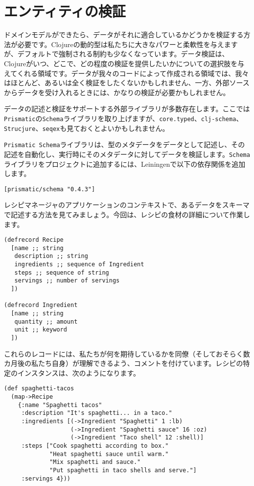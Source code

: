 \section{エンティティの検証}

ドメインモデルができたら、データがそれに適合しているかどうかを検証する方法が必要です。Clojureの動的型は私たちに大きなパワーと柔軟性を与えますが、デフォルトで強制される制約も少なくなっています。データ検証は、Clojureがいつ、どこで、どの程度の検証を提供したいかについての選択肢を与えてくれる領域です。データが我々のコードによって作成される領域では、我々はほとんど、あるいは全く検証をしたくないかもしれません、一方、外部ソースからデータを受け入れるときには、かなりの検証が必要かもしれません。

データの記述と検証をサポートする外部ライブラリが多数存在します。ここでは\texttt{Prismatic}の\texttt{Schema}ライブラリを取り上げますが、\texttt{core.typed}、\texttt{clj-schema}、\texttt{Strucjure}、\texttt{seqex}も見ておくとよいかもしれません。

\texttt{Prismatic Schema}ライブラリは、型のメタデータをデータとして記述し、その記述を自動化し、実行時にそのメタデータに対してデータを検証します。\texttt{Schema}ライブラリをプロジェクトに追加するには、Leiningenで以下の依存関係を追加します。


\begin{lstlisting}[numbers=none]
[prismatic/schema "0.4.3"]
\end{lstlisting}

レシピマネージャのアプリケーションのコンテキストで、あるデータをスキーマで記述する方法を見てみましょう。今回は、レシピの食材の詳細について作業します。


\begin{lstlisting}[numbers=none]
(defrecord Recipe
  [name ;; string
   description ;; string
   ingredients ;; sequence of Ingredient
   steps ;; sequence of string
   servings ;; number of servings
  ])

(defrecord Ingredient
  [name ;; string
   quantity ;; amount
   unit ;; keyword
  ])
\end{lstlisting}

これらのレコードには、私たちが何を期待しているかを同僚（そしておそらく数カ月後の私たち自身）が理解できるよう、コメントを付けています。レシピの特定のインスタンスは、次のようになります。


\begin{lstlisting}[numbers=none]
(def spaghetti-tacos
  (map->Recipe
    {:name "Spaghetti tacos"
     :description "It's spaghetti... in a taco."
     :ingredients [(->Ingredient "Spaghetti" 1 :lb)
                   (->Ingredient "Spaghetti sauce" 16 :oz)
                   (->Ingredient "Taco shell" 12 :shell)]
     :steps ["Cook spaghetti according to box."
             "Heat spaghetti sauce until warm."
             "Mix spaghetti and sauce."
             "Put spaghetti in taco shells and serve."]
     :servings 4}))
\end{lstlisting}

